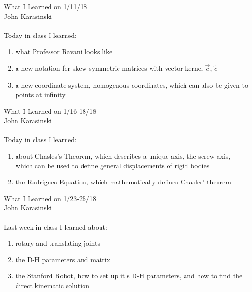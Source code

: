 \documentclass[12pt]{report}
\def\doubleunderline#1{\underline{\underline{#1}}}
\begin{document}
\noindent\huge{What I Learned on 1/11/18}\\
\large{John Karasinski}\\
\\
Today in class I learned:
\begin{enumerate}
\item what Professor Ravani looks like
\item a new notation for skew symmetric matrices with vector kernel $\overrightarrow{c}$, $\widetilde{\doubleunderline{c}}$
\item a new coordinate system, homogenous coordinates, which can also be given to points at infinity
\end{enumerate}

\clearpage
\noindent\huge{What I Learned on 1/16-18/18}\\
\large{John Karasinski}\\
\\
Today in class I learned:
\begin{enumerate}
\item about Chasles's Theorem, which describes a unique axis, the screw axis, which can be used to define general displacements of rigid bodies
\item the Rodrigues Equation, which mathematically defines Chasles' theorem
\end{enumerate}

\clearpage
\noindent\huge{What I Learned on 1/23-25/18}\\
\large{John Karasinski}\\
\\
Last week in class I learned about:
\begin{enumerate}
\item rotary and translating joints
\item the D-H parameters and matrix
\item the Stanford Robot, how to set up it's D-H parameters, and how to find the direct kinematic solution
\end{enumerate}
\end{document}
